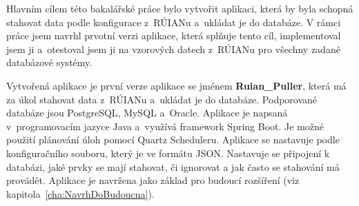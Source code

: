 Hlavním cílem této bakalářské práce bylo vytvořit aplikaci, která by byla 
schopná stahovat data podle konfigurace z~RÚIANu a~ukládat je do databáze.
V rámci práce jsem navrhl prvotní verzi aplikace, která splňuje tento cíl,
implementoval jsem ji a~otestoval jsem ji na vzorových datech z~RÚIANu
pro všechny zadané databázové systémy.

Vytvořená aplikace je první verze aplikace se jménem \textbf{Ruian\_Puller}, 
která má za úkol stahovat data z~RÚIANu a~ukládat je do databáze.
Podporované databáze jsou PostgreSQL, MySQL a~Oracle.
Aplikace je napsaná v~programovacím jazyce Java a~využívá framework Spring Boot.
Je možné použití plánování úloh pomocí Quartz Scheduleru.
Aplikace se nastavuje podle konfiguračního souboru,
který je ve formátu JSON. Nastavuje se připojení k databázi,
jaké prvky se mají stahovat, či ignorovat a jak často se stahování má provádět.
Aplikace je navržena jako základ pro budoucí rozšíření (viz kapitola~\ref{cha:NavrhDoBudoucna}).